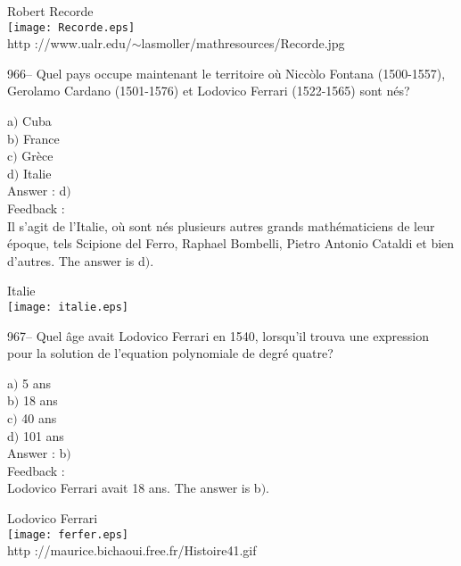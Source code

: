 \documentclass[letterpaper, 12pt]{article}
\begin{document}
        \begin{center}
        Robert Recorde\\
    \texttt{[image: Recorde.eps]}\\
        {\footnotesize http
://www.ualr.edu/$\sim$lasmoller/mathresources/Recorde.jpg}
    \end{center}

966-- Quel pays occupe maintenant le territoire o\`u Nicc\`olo
Fontana (1500-1557), Gerolamo Cardano (1501-1576) et Lodovico
Ferrari (1522-1565) sont n\'es?

a$)$ Cuba \\
b$)$ France  \\
c$)$ Gr\`ece \\
d$)$ Italie \\

Answer : d$)$\\

Feedback : \\
Il s'agit de l'Italie, o\`u sont n\'es plusieurs autres grands
math\'ematiciens de leur \'epoque, tels Scipione del Ferro, Raphael
Bombelli, Pietro Antonio Cataldi et bien d'autres. The answer is
d$)$.

        \begin{center}
        Italie\\
    \texttt{[image: italie.eps]}\\
    \end{center}

967-- Quel \^age avait Lodovico Ferrari en 1540, lorsqu'il trouva
une expression pour la solution de l'equation polynomiale de
degr\'e quatre?

a$)$ 5 ans \\
b$)$ 18 ans  \\
c$)$ 40 ans \\
d$)$ 101 ans \\

Answer : b$)$\\

Feedback : \\
Lodovico Ferrari avait 18 ans. The answer is b$)$.\\

        \begin{center}
        Lodovico Ferrari\\
    \texttt{[image: ferfer.eps]}\\
        {\footnotesize http ://maurice.bichaoui.free.fr/Histoire41.gif}
    \end{center}
\end{document}
